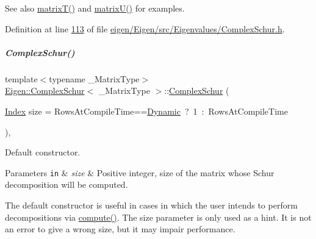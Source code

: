 \begin{DoxySeeAlso}{See also}
\hyperlink{group___eigenvalues___module_add3ab5ed83f7f2f06b79fa910a2d5684}{matrix\+T()} and \hyperlink{group___eigenvalues___module_afed8177cf9836f032d42bdb6c6bc6e01}{matrix\+U()} for examples. 
\end{DoxySeeAlso}


Definition at line \hyperlink{eigen_2_eigen_2src_2_eigenvalues_2_complex_schur_8h_source_l00113}{113} of file \hyperlink{eigen_2_eigen_2src_2_eigenvalues_2_complex_schur_8h_source}{eigen/\+Eigen/src/\+Eigenvalues/\+Complex\+Schur.\+h}.

\mbox{\label{group___eigenvalues___module_ad707d9978dc36b3b15e460c2a83f4093}} 
\subparagraph{\texorpdfstring{Complex\+Schur()}{ComplexSchur()}\hspace{0.1cm}{\footnotesize\ttfamily [3/4]}}
{\footnotesize\ttfamily template$<$typename \+\_\+\+Matrix\+Type$>$ \\
\hyperlink{group___eigenvalues___module_class_eigen_1_1_complex_schur}{Eigen\+::\+Complex\+Schur}$<$ \+\_\+\+Matrix\+Type $>$\+::\hyperlink{group___eigenvalues___module_class_eigen_1_1_complex_schur}{Complex\+Schur} (\begin{DoxyParamCaption}\item[{\hyperlink{group___eigenvalues___module_a652104d13723a5b1db2937866a034557}{Index}}]{size = {\ttfamily RowsAtCompileTime==\hyperlink{namespace_eigen_ad81fa7195215a0ce30017dfac309f0b2}{Dynamic}~?~1~\+:~RowsAtCompileTime} }\end{DoxyParamCaption})\hspace{0.3cm}{\ttfamily [inline]}, {\ttfamily [explicit]}}



Default constructor. 


\begin{DoxyParams}[1]{Parameters}
\mbox{\tt in}  & {\em size} & Positive integer, size of the matrix whose Schur decomposition will be computed.\\
\hline
\end{DoxyParams}
The default constructor is useful in cases in which the user intends to perform decompositions via \hyperlink{group___eigenvalues___module_a3543d2c286563108cd9ace672bbb1c09}{compute()}. The {\ttfamily size} parameter is only used as a hint. It is not an error to give a wrong {\ttfamily size}, but it may impair performance.

